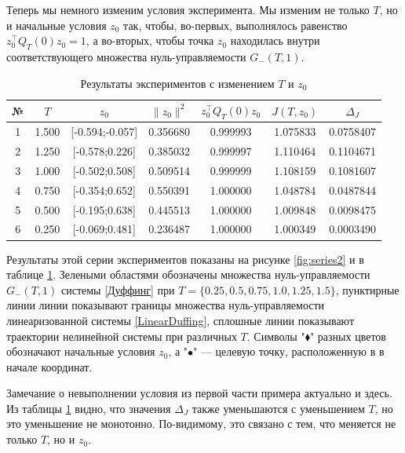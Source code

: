 \documentclass[../main.tex]{subfiles}
\begin{document}
Теперь мы немного изменим условия эксперимента. 
Мы изменим не только $T$, но и начальные условия $z_0$ так, чтобы, во-первых, выполнялось равенство 
$z_0^{\top} Q_T(0) z_0 = 1$, а во-вторых, чтобы точка $z_0$ находилась внутри 
соответствующего множества нуль-управляемости $G_{-}(T,1)$.


\begin{table}
\caption{Результаты экспериментов с изменением $T$ и $z_0$}
\label{ExampleTable2}
\begin{center}
\begin{tabular}{c|c|c|c|c|c|c}
     № &    $T$  & $z_0$            & $\|z_0\|^2$&$z_0^{\top} Q_T(0) z_0$ &$J(T,z_0)$&$\Delta_J$ \\ \hline 
     1 &   1.500 & [-0.594;-0.057]  & 0.356680   & 0.999993    & 1.075833 & 0.0758407 \\ \hline
     2 &   1.250 & [-0.578;0.226]   & 0.385032   & 0.999997    & 1.110464 & 0.1104671 \\ \hline
     3 &   1.000 & [-0.502;0.508]   & 0.509514   & 0.999999    & 1.108159 & 0.1081607 \\ \hline
     4 &   0.750 & [-0.354;0.652]   & 0.550391   & 1.000000    & 1.048784 & 0.0487844 \\ \hline
     5 &   0.500 & [-0.195;0.638]   & 0.445513   & 1.000000    & 1.009848 & 0.0098475 \\ \hline
     6 &   0.250 & [-0.069;0.481]   & 0.236487   & 1.000000    & 1.000349 & 0.0003490 \\ \hline
\end{tabular}
\end{center}
\end{table} 

Результаты этой серии экспериментов 
показаны на рисунке \ref{fig:series2} и в таблице 
\ref{ExampleTable2}.
Зелеными областями обозначены множества нуль-управляемости $G_{-}(T,1)$ системы 
\eqref{Дуффинг} при $T = \{0.25, 0.5, 0.75, 1.0, 1.25, 1.5\}$, пунктирные линии 
линии показывают границы множества нуль-управляемости линеаризованной системы 
\eqref{LinearDuffing}, сплошные линии показывают траектории нелинейной системы 
при различных $T$. 
Символы "$\blacklozenge$" разных цветов обозначают 
начальные условия $z_0$, а "$\bullet$" --- целевую точку, расположенную в 
в начале координат. 

Замечание о невыполнении условия из первой части примера актуально и здесь. 
Из таблицы \ref{ExampleTable2} видно, что значения $\Delta_J$ также уменьшаются с уменьшением $T$, но это уменьшение не монотонно. 
По-видимому, это связано с тем, что меняется не только $T$, но и $z_0$.
\end{document}
